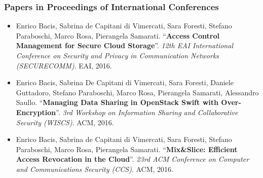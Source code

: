 \subsubsection*{Papers in Proceedings of International Conferences}
\begin{itemize}	
	
	\item Enrico Bacis, Sabrina de Capitani di Vimercati, Sara Foresti, Stefano Paraboschi, Marco Rosa, Pierangela Samarati. ``\textbf{Access Control Management for Secure Cloud Storage}''. {\em 12th EAI International Conference on Security and Privacy in Communication Networks (SECURECOMM)}. EAI, 2016.
	
	\item Enrico Bacis, Sabrina De Capitani di Vimercati, Sara Foresti, Daniele Guttadoro, Stefano Paraboschi, Marco Rosa, Pierangela Samarati, Alessandro Saullo. ``\textbf{Managing Data Sharing in OpenStack Swift with Over-Encryption}''. {\em 3rd Workshop on Information Sharing and Collaborative Security (WISCS)}. ACM, 2016.
	
	\item Enrico Bacis, Sabrina de Capitani di Vimercati, Sara Foresti, Stefano Paraboschi, Marco Rosa, Pierangela Samarati. ``\textbf{Mix\&Slice: Efficient Access Revocation in the Cloud}''. {\em 23rd ACM Conference on Computer and Communications Security (CCS)}. ACM, 2016.
	
	
	
	

\end{itemize}
